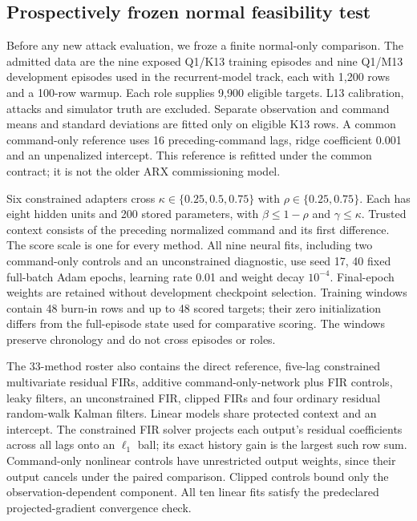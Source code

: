 \subsection{Prospectively frozen normal feasibility test}\label{sec:gainpilot}
Before any new attack evaluation, we froze a finite normal-only comparison. The admitted data are the nine exposed Q1/K13 training episodes and nine Q1/M13 development episodes used in the recurrent-model track, each with 1,200 rows and a 100-row warmup. Each role supplies 9,900 eligible targets. L13 calibration, attacks and simulator truth are excluded. Separate observation and command means and standard deviations are fitted only on eligible K13 rows. A common command-only reference uses 16 preceding-command lags, ridge coefficient 0.001 and an unpenalized intercept. This reference is refitted under the common contract; it is not the older ARX commissioning model.

Six constrained adapters cross $\kappa\in\{0.25,0.5,0.75\}$ with $\rho\in\{0.25,0.75\}$. Each has eight hidden units and 200 stored parameters, with $\beta\leq1-\rho$ and $\gamma\leq\kappa$. Trusted context consists of the preceding normalized command and its first difference. The score scale is one for every method. All nine neural fits, including two command-only controls and an unconstrained diagnostic, use seed 17, 40 fixed full-batch Adam epochs, learning rate 0.01 and weight decay $10^{-4}$. Final-epoch weights are retained without development checkpoint selection. Training windows contain 48 burn-in rows and up to 48 scored targets; their zero initialization differs from the full-episode state used for comparative scoring. The windows preserve chronology and do not cross episodes or roles.

The 33-method roster also contains the direct reference, five-lag constrained multivariate residual FIRs, additive command-only-network plus FIR controls, leaky filters, an unconstrained FIR, clipped FIRs and four ordinary residual random-walk Kalman filters. Linear models share protected context and an intercept. The constrained FIR solver projects each output's residual coefficients across all lags onto an $\ell_1$ ball; its exact history gain is the largest such row sum. Command-only nonlinear controls have unrestricted output weights, since their output cancels under the paired comparison. Clipped controls bound only the observation-dependent component. All ten linear fits satisfy the predeclared projected-gradient convergence check.

